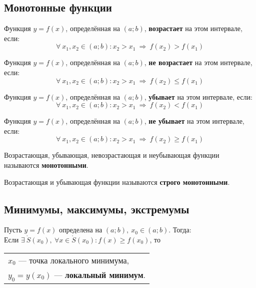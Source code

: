\subsection{Монотонные функции}\label{Монотонные функции}

\begin{definition}
	Функция $y=f(x)$, определённая на $(a;b)$, \textbf{возрастает} на этом интервале, если: \[ \forall\ x_1, x_2 \in (a;b)\colon x_2 > x_1\ \Rightarrow\ f(x_2) > f(x_1) \]
\end{definition}
\newpage
\begin{definition}
	Функция $y=f(x)$, определённая на $(a;b)$, \textbf{не возрастает} на этом интервале, если:
	\[ \forall\ x_1, x_2 \in (a;b)\colon x_2 > x_1\ \Rightarrow\ f(x_2) \le f(x_1) \]
\end{definition}

\begin{definition}
	Функция $y=f(x)$, определённая на $(a;b)$, \textbf{убывает} на этом интервале, если: \[ \forall\ x_1, x_2 \in (a;b)\colon x_2 > x_1\ \Rightarrow\ f(x_2) < f(x_1) \]
\end{definition}

\begin{definition}
	Функция $y=f(x)$, определённая на $(a;b)$, \textbf{не убывает} на этом интервале, если:
	\[ \forall\ x_1, x_2 \in (a;b)\colon x_2 > x_1\ \Rightarrow\ f(x_2) \ge f(x_1) \]
\end{definition}

\begin{definition}
    Возрастающая, убывающая, невозрастающая и неубывающая функции называются \textbf{монотонными}.
\end{definition}

\begin{definition}
    Возрастающая и убывающая функции называются \textbf{строго монотонными}.
\end{definition}

\subsection{Минимумы, максимумы, экстремумы}

\begin{definition}
	Пусть $y=f(x)$ определена на $(a;b),\ x_0 \in (a;b)$. Тогда:\\[1ex]
	Если $\exists\ \mathring{S}(x_0),\ \forall x \in \mathring{S}(x_0)\colon f(x) \ge f(x_0)$, то \begin{tabular}{l} $x_0$ --- точка локального минимума, \\ $y_0 = y(x_0)$ --- \textbf{локальный минимум}. \end{tabular}
\end{definition}

